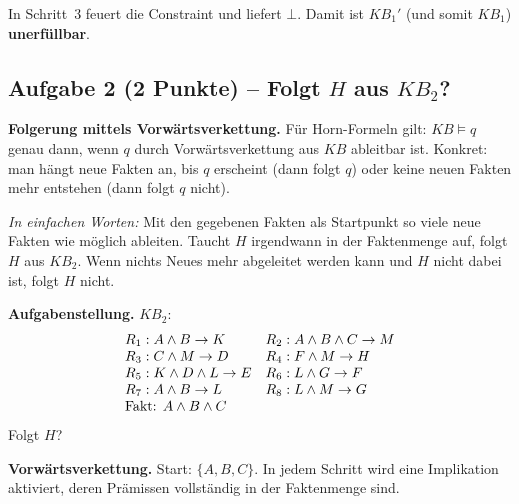 \documentclass[a4paper,12pt]{article}
\begin{document}
In Schritt~3 feuert die Constraint und liefert $\bot$. Damit ist $KB_1'$
(und somit $KB_1$) \textbf{unerf\"ullbar}.

\medskip
\noindent{}

\newpage

\subsection*{Aufgabe 2 \textnormal{(2 Punkte)} -- Folgt $H$ aus $KB_2$?}

\textbf{Folgerung mittels Vorw\"artsverkettung.}
F\"ur Horn-Formeln gilt: $KB \models q$ genau dann, wenn $q$ durch
Vorw\"artsverkettung aus $KB$ ableitbar ist. Konkret: man h\"angt
neue Fakten an, bis $q$ erscheint (dann folgt $q$) oder keine neuen
Fakten mehr entstehen (dann folgt $q$ nicht).

\emph{In einfachen Worten:} Mit den gegebenen Fakten als Startpunkt so
viele neue Fakten wie m\"oglich ableiten. Taucht $H$ irgendwann in der
Faktenmenge auf, folgt $H$ aus $KB_2$. Wenn nichts Neues mehr abgeleitet
werden kann und $H$ nicht dabei ist, folgt $H$ nicht.

\medskip
\textbf{Aufgabenstellung.} $KB_2$:
\[
\begin{array}{ll}
R_1: A \wedge B \to K        & R_2: A \wedge B \wedge C \to M \\
R_3: C \wedge M \to D        & R_4: F \wedge M \to H \\
R_5: K \wedge D \wedge L \to E & R_6: L \wedge G \to F \\
R_7: A \wedge B \to L        & R_8: L \wedge M \to G \\
\multicolumn{2}{l}{\text{Fakt: } A \wedge B \wedge C}
\end{array}
\]
Folgt $H$?

\bigskip
\textbf{Vorw\"artsverkettung.}
Start: $\{A, B, C\}$. In jedem Schritt wird eine Implikation aktiviert,
deren Pr\"amissen vollst\"andig in der Faktenmenge sind.
\end{document}
